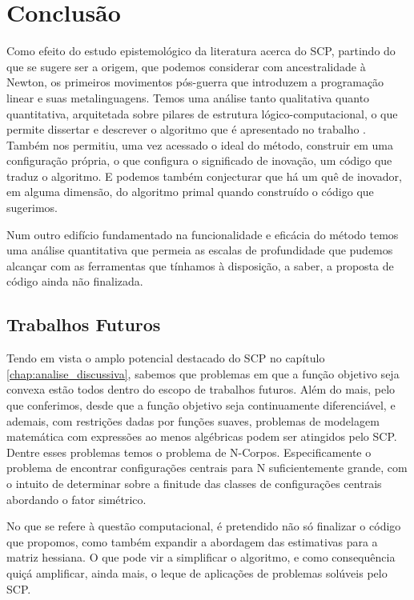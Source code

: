 
\chapter{Conclusão}
\label{chap:conclusao}

\noindent
Como efeito do estudo epistemológico da literatura acerca do SCP, partindo
do que se sugere ser a origem, que podemos considerar com ancestralidade à
Newton, os primeiros movimentos pós-guerra que introduzem a programação linear
e suas metalinguagens. Temos uma análise tanto qualitativa quanto quantitativa, arquitetada sobre pilares
de estrutura lógico-computacional, o que permite dissertar e descrever o
algoritmo que é apresentado no trabalho \cite{Still2010}. Também nos permitiu,
uma vez acessado o ideal do método, construir em uma configuração própria, o
que configura o significado de inovação, um código que traduz o algoritmo.
E podemos também conjecturar que há um quê de inovador, em alguma dimensão,
do algoritmo primal quando construído o código que sugerimos.

Num outro edifício fundamentado na funcionalidade e eficácia do método temos
uma análise quantitativa que permeia as escalas de profundidade que pudemos
alcançar com as ferramentas que tínhamos à disposição, a saber, a proposta de
código ainda não finalizada. 

\section{Trabalhos Futuros}
\label{sec:trabalhosFuturos}

\noindent
Tendo em vista o amplo potencial destacado do SCP no capítulo
\ref{chap:analise_discussiva}, sabemos que problemas em que a função
objetivo seja convexa estão todos dentro do escopo de trabalhos futuros. Além
do mais, pelo que conferimos, desde que a função objetivo seja continuamente
diferenciável, e ademais, com restrições dadas por funções suaves,
problemas de modelagem matemática com expressões ao menos algébricas podem
ser atingidos pelo SCP. Dentre esses problemas temos o problema de N-Corpos.
Especificamente o problema de encontrar configurações centrais para N
suficientemente grande, com o intuito de determinar sobre a finitude das
classes de configurações centrais abordando o fator simétrico.

No que se refere à questão computacional, é pretendido não só finalizar o
código que propomos, como também expandir a abordagem das estimativas para a
matriz hessiana. O que pode vir a simplificar o algoritmo, e como consequência
quiçá amplificar, ainda mais, o leque de aplicações de problemas solúveis pelo
SCP.

